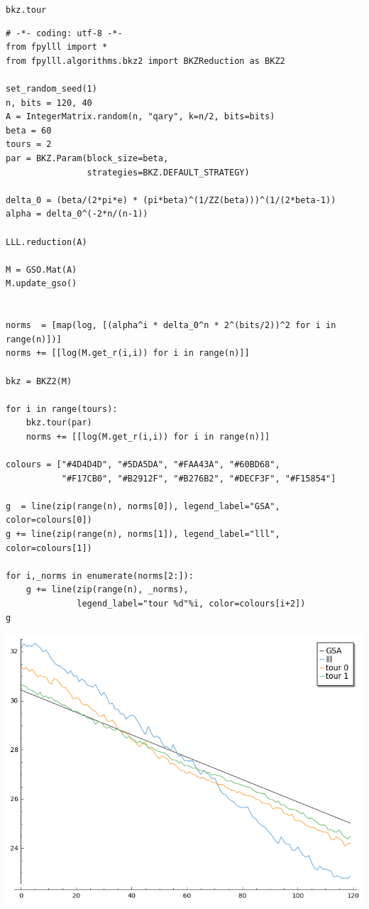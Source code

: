 \documentclass[10pt,a4paper,nobib]{tufte-handout}
\begin{document}
\texttt{bkz.tour}

\lstset{language=sage,label= ,caption= ,captionpos=b,numbers=none}
\begin{lstlisting}
# -*- coding: utf-8 -*-
from fpylll import *
from fpylll.algorithms.bkz2 import BKZReduction as BKZ2

set_random_seed(1)
n, bits = 120, 40
A = IntegerMatrix.random(n, "qary", k=n/2, bits=bits)
beta = 60
tours = 2
par = BKZ.Param(block_size=beta,
                strategies=BKZ.DEFAULT_STRATEGY) 

delta_0 = (beta/(2*pi*e) * (pi*beta)^(1/ZZ(beta)))^(1/(2*beta-1))
alpha = delta_0^(-2*n/(n-1))

LLL.reduction(A)

M = GSO.Mat(A)
M.update_gso()


norms  = [map(log, [(alpha^i * delta_0^n * 2^(bits/2))^2 for i in range(n)])]
norms += [[log(M.get_r(i,i)) for i in range(n)]]

bkz = BKZ2(M)

for i in range(tours):
    bkz.tour(par)
    norms += [[log(M.get_r(i,i)) for i in range(n)]]
        
colours = ["#4D4D4D", "#5DA5DA", "#FAA43A", "#60BD68", 
           "#F17CB0", "#B2912F", "#B276B2", "#DECF3F", "#F15854"]

g  = line(zip(range(n), norms[0]), legend_label="GSA", color=colours[0])
g += line(zip(range(n), norms[1]), legend_label="lll", color=colours[1])

for i,_norms in enumerate(norms[2:]):
    g += line(zip(range(n), _norms), 
              legend_label="tour %d"%i, color=colours[i+2])
g
\end{lstlisting}

\begin{center}
\includegraphics[width=.9\linewidth]{lab-02-solution-plot-gsa-2.png}
\end{center}
\end{document}
